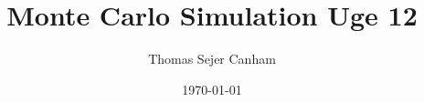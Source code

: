 \documentclass{article}
\title{Monte Carlo Simulation Uge 12}
\author{Thomas Sejer Canham}
\date{\today}
\theoremstyle{definition}
\theoremstyle{remark}
\begin{document}

\begin{titlepage}

    \maketitle
    \thispagestyle{empty}

\end{titlepage}
\end{document}

